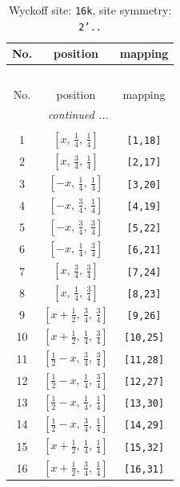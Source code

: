 \documentclass[fleqn,8pt]{jsarticle}
\begin{document}
\renewcommand{\arraystretch}{1.2}
\begin{longtable}{ccc}
\caption{Wyckoff site: {\tt 16k}, site symmetry: {\tt 2'..}}
 \\
 \hline \hline
No. & position & mapping \\ \hline \endfirsthead

\multicolumn{2}{l}{\tablename\ \thetable{}} \\
 \hline \hline
No. & position & mapping \\ \hline \endhead

 \hline \hline
\multicolumn{2}{r}{\footnotesize\it continued ...} \\ \endfoot

 \hline \hline
\multicolumn{2}{r}{} \\ \endlastfoot

1 & $\left[ x,\, \frac{1}{4},\, \frac{1}{4} \right]$ & {\tt [1,18]} \\ \hline
2 & $\left[ x,\, \frac{3}{4},\, \frac{1}{4} \right]$ & {\tt [2,17]} \\ \hline
3 & $\left[ - x,\, \frac{1}{4},\, \frac{1}{4} \right]$ & {\tt [3,20]} \\ \hline
4 & $\left[ - x,\, \frac{3}{4},\, \frac{1}{4} \right]$ & {\tt [4,19]} \\ \hline
5 & $\left[ - x,\, \frac{3}{4},\, \frac{3}{4} \right]$ & {\tt [5,22]} \\ \hline
6 & $\left[ - x,\, \frac{1}{4},\, \frac{3}{4} \right]$ & {\tt [6,21]} \\ \hline
7 & $\left[ x,\, \frac{3}{4},\, \frac{3}{4} \right]$ & {\tt [7,24]} \\ \hline
8 & $\left[ x,\, \frac{1}{4},\, \frac{3}{4} \right]$ & {\tt [8,23]} \\ \hline
9 & $\left[ x + \frac{1}{2},\, \frac{3}{4},\, \frac{3}{4} \right]$ & {\tt [9,26]} \\ \hline
10 & $\left[ x + \frac{1}{2},\, \frac{1}{4},\, \frac{3}{4} \right]$ & {\tt [10,25]} \\ \hline
11 & $\left[ \frac{1}{2} - x,\, \frac{3}{4},\, \frac{3}{4} \right]$ & {\tt [11,28]} \\ \hline
12 & $\left[ \frac{1}{2} - x,\, \frac{1}{4},\, \frac{3}{4} \right]$ & {\tt [12,27]} \\ \hline
13 & $\left[ \frac{1}{2} - x,\, \frac{1}{4},\, \frac{1}{4} \right]$ & {\tt [13,30]} \\ \hline
14 & $\left[ \frac{1}{2} - x,\, \frac{3}{4},\, \frac{1}{4} \right]$ & {\tt [14,29]} \\ \hline
15 & $\left[ x + \frac{1}{2},\, \frac{1}{4},\, \frac{1}{4} \right]$ & {\tt [15,32]} \\ \hline
16 & $\left[ x + \frac{1}{2},\, \frac{3}{4},\, \frac{1}{4} \right]$ & {\tt [16,31]} \\
\end{longtable}
\end{document}
